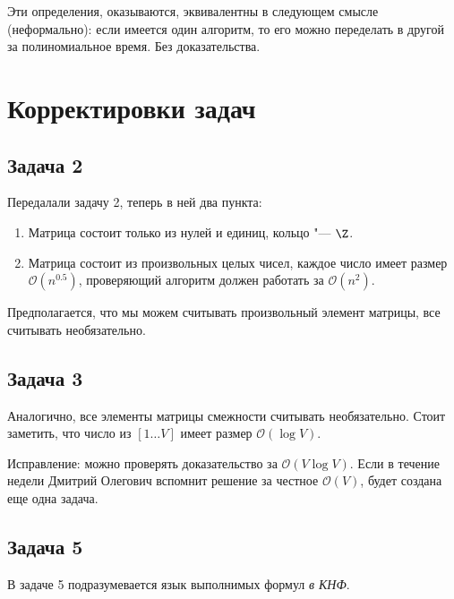 \begin{Rem}
	Эти определения, оказываются, эквивалентны в следующем смысле (неформально):
	если имеется один алгоритм, то его можно переделать в другой за полиномиальное время.
	Без доказательства.
\end{Rem}

\section{Корректировки задач}
\subsection{Задача 2}
	Передалали задачу 2, теперь в ней два пункта:
	\begin{enumerate}
		\item Матрица состоит только из нулей и единиц, кольцо "--- $\Z$.
		\item
			Матрица состоит из произвольных целых чисел, каждое число имеет размер $\mathcal O(n^{0.5})$,
			проверяющий алгоритм должен работать за $\mathcal O(n^2)$.
	\end{enumerate}
	Предполагается, что мы можем считывать произвольный элемент матрицы, все считывать необязательно.

\subsection{Задача 3}
	Аналогично, все элементы матрицы смежности считывать необязательно.
	Стоит заметить, что число из $[1\dots V]$ имеет размер $\mathcal O(\log V)$.

	Исправление: можно проверять доказательство за $\mathcal O(V \log V)$.
	Если в течение недели Дмитрий Олегович вспомнит решение за честное $\mathcal O(V)$, будет создана еще одна задача.

\subsection{Задача 5}
	В задаче 5 подразумевается язык выполнимых формул \textit{в КНФ}.
